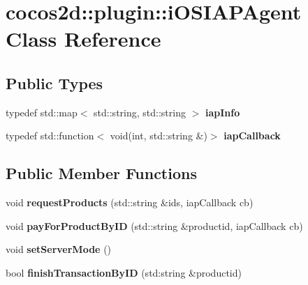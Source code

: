 \hypertarget{classcocos2d_1_1plugin_1_1iOSIAPAgent}{}\section{cocos2d\+:\+:plugin\+:\+:i\+O\+S\+I\+A\+P\+Agent Class Reference}
\label{classcocos2d_1_1plugin_1_1iOSIAPAgent}
\subsection*{Public Types}
\begin{DoxyCompactItemize}
\item 
\mbox{\label{classcocos2d_1_1plugin_1_1iOSIAPAgent_a8da382282aaaec8002f8516355ecb174}} 
typedef std\+::map$<$ std\+::string, std\+::string $>$ {\bfseries iap\+Info}
\item 
\mbox{\label{classcocos2d_1_1plugin_1_1iOSIAPAgent_ab294f3398764e13157487c3fc85091c8}} 
typedef std\+::function$<$ void(int, std\+::string \&)$>$ {\bfseries iap\+Callback}
\end{DoxyCompactItemize}
\subsection*{Public Member Functions}
\begin{DoxyCompactItemize}
\item 
\mbox{\label{classcocos2d_1_1plugin_1_1iOSIAPAgent_a00c617c40e694f7e19b49e7b2220f79a}} 
void {\bfseries request\+Products} (std\+::string \&ids, iap\+Callback cb)
\item 
\mbox{\label{classcocos2d_1_1plugin_1_1iOSIAPAgent_a661a742163a72874b0f00480e6a580fb}} 
void {\bfseries pay\+For\+Product\+By\+ID} (std\+::string \&productid, iap\+Callback cb)
\item 
\mbox{\label{classcocos2d_1_1plugin_1_1iOSIAPAgent_ad2471e0047ece027db2def334eea8d83}} 
void {\bfseries set\+Server\+Mode} ()
\item 
\mbox{\label{classcocos2d_1_1plugin_1_1iOSIAPAgent_a27adccaca5b95e782ff187199e96219e}} 
bool {\bfseries finish\+Transaction\+By\+ID} (std\+:string \&productid)
\end{DoxyCompactItemize}
